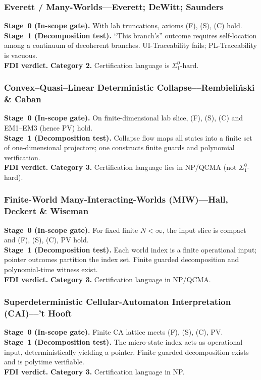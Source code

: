 \documentclass[12pt]{article}
\theoremstyle{definition}
\theoremstyle{plain}
\begin{document}
\subsubsection{Everett / Many-Worlds––Everett; DeWitt; Saunders}
\textbf{Stage~0 (In-scope gate).} With lab truncations, axioms (F), (S), (C) hold.\\
\textbf{Stage~1 (Decomposition test).} “This branch’s” outcome requires self-location among a continuum of decoherent branches. UI-Traceability fails; PL-Traceability is vacuous.\\
\textbf{FDI verdict.} \textbf{Category 2.} Certification language is \(\Sigma^0_1\text{-hard}\).  


\subsubsection{Convex–Quasi–Linear Deterministic Collapse––Rembieliński \& Caban}
\textbf{Stage~0 (In-scope gate).} On finite-dimensional lab slice, (F), (S), (C) and EM1–EM3 (hence PV) hold.\\
\textbf{Stage~1 (Decomposition test).} Collapse flow maps all states into a finite set of one-dimensional projectors; one constructs finite guards and polynomial verification.\\
\textbf{FDI verdict.} \textbf{Category 3.} Certification language lies in NP/QCMA (not \(\Sigma^0_1\)-hard).  

\subsubsection{Finite-World Many-Interacting-Worlds (MIW)––Hall, Deckert \& Wiseman}
\textbf{Stage~0 (In-scope gate).} For fixed finite \(N<\infty\), the input slice is compact and (F), (S), (C), PV hold.\\
\textbf{Stage~1 (Decomposition test).} Each world index is a finite operational input; pointer outcomes partition the index set. Finite guarded decomposition and polynomial‐time witness exist.\\
\textbf{FDI verdict.} \textbf{Category 3.} Certification language in NP/QCMA.  


\subsubsection{Superdeterministic Cellular‐Automaton Interpretation (CAI)––’t Hooft}
\textbf{Stage~0 (In-scope gate).} Finite CA lattice meets (F), (S), (C), PV.\\
\textbf{Stage~1 (Decomposition test).} The micro‐state index acts as operational input, deterministically yielding a pointer. Finite guarded decomposition exists and is polytime verifiable.\\
\textbf{FDI verdict.} \textbf{Category 3.} Certification language in NP.  
\end{document}
